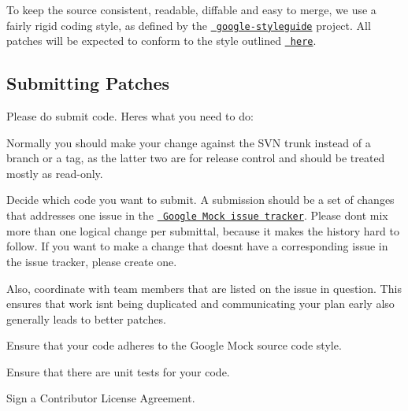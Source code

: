 To keep the source consistent, readable, diffable and easy to merge, we use a fairly rigid coding style, as defined by the \href{https://github.com/google/styleguide}\texttt{ google-\/styleguide} project. All patches will be expected to conform to the style outlined \href{https://github.com/google/styleguide/blob/gh-pages/cppguide.xml}\texttt{ here}.

\subsection*{Submitting Patches}

Please do submit code. Here\textquotesingle{}s what you need to do\+:


\begin{DoxyEnumerate}
\item Normally you should make your change against the S\+VN trunk instead of a branch or a tag, as the latter two are for release control and should be treated mostly as read-\/only.
\end{DoxyEnumerate}
\begin{DoxyEnumerate}
\item Decide which code you want to submit. A submission should be a set of changes that addresses one issue in the \href{http://code.google.com/p/googlemock/issues/list}\texttt{ Google Mock issue tracker}. Please don\textquotesingle{}t mix more than one logical change per submittal, because it makes the history hard to follow. If you want to make a change that doesn\textquotesingle{}t have a corresponding issue in the issue tracker, please create one.
\end{DoxyEnumerate}
\begin{DoxyEnumerate}
\item Also, coordinate with team members that are listed on the issue in question. This ensures that work isn\textquotesingle{}t being duplicated and communicating your plan early also generally leads to better patches.
\end{DoxyEnumerate}
\begin{DoxyEnumerate}
\item Ensure that your code adheres to the Google Mock source code style.
\end{DoxyEnumerate}
\begin{DoxyEnumerate}
\item Ensure that there are unit tests for your code.
\end{DoxyEnumerate}
\begin{DoxyEnumerate}
\item Sign a Contributor License Agreement.
\end{DoxyEnumerate}
